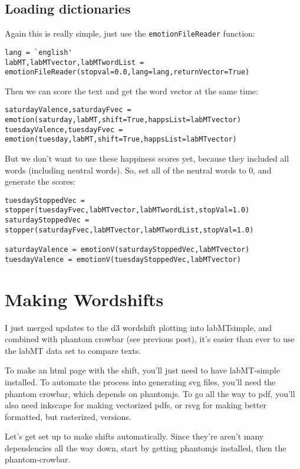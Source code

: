 \subsection{Loading dictionaries}
\label{detailed-example:loading-dictionaries}
Again this is really simple, just use the \lstinline{emotionFileReader} function:
\begin{lstlisting}
lang = `english'
labMT,labMTvector,labMTwordList = emotionFileReader(stopval=0.0,lang=lang,returnVector=True)
\end{lstlisting}

Then we can score the text and get the word vector at the same time:
\begin{lstlisting}
saturdayValence,saturdayFvec = emotion(saturday,labMT,shift=True,happsList=labMTvector)
tuesdayValence,tuesdayFvec = emotion(tuesday,labMT,shift=True,happsList=labMTvector)
\end{lstlisting}

But we don't want to use these happiness scores yet, because they included all words (including neutral words).
So, set all of the neutral words to 0, and generate the scores:
\begin{lstlisting}
tuesdayStoppedVec = stopper(tuesdayFvec,labMTvector,labMTwordList,stopVal=1.0)
saturdayStoppedVec = stopper(saturdayFvec,labMTvector,labMTwordList,stopVal=1.0)

saturdayValence = emotionV(saturdayStoppedVec,labMTvector)
tuesdayValence = emotionV(tuesdayStoppedVec,labMTvector)
\end{lstlisting}


\section{Making Wordshifts}
\label{wordshifts::doc}\label{wordshifts:making-wordshifts}
I just merged updates to the d3 wordshift plotting into labMTsimple, and combined with phantom crowbar (see previous post), it's easier than ever to use the labMT data set to compare texts.

To make an html page with the shift, you'll just need to have labMT-simple installed.
To automate the process into generating svg files, you'll need the phantom crowbar, which depends on phantomjs.
To go all the way to pdf, you'll also need inkscape for making vectorized pdfs, or rsvg for making better formatted, but rasterized, versions.

Let's get set up to make shifts automatically.
Since they're aren't many dependencies all the way down, start by getting phantomjs installed, then the phantom-crowbar.


